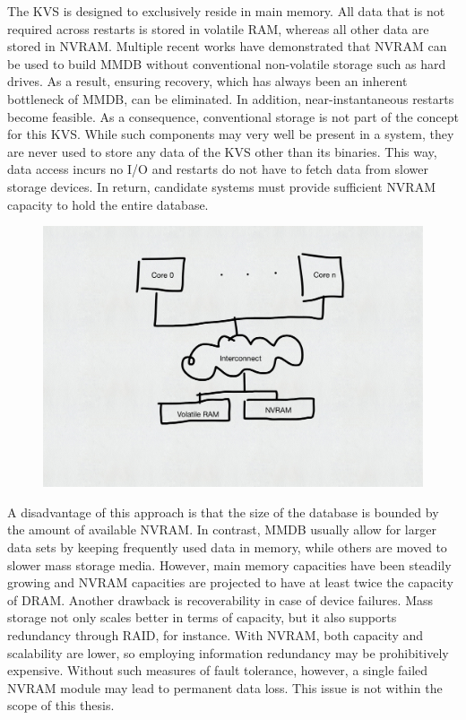 The \ac{KVS} is designed to exclusively reside in main memory. All data that is
not required across restarts is stored in volatile \ac{RAM}, whereas all other
data are stored in \ac{NVRAM}. Multiple recent works have demonstrated that
\ac{NVRAM} can be used to build \ac{MMDB} without conventional non-volatile
storage such as hard drives. As a result, ensuring recovery, which has always
been an inherent bottleneck of \ac{MMDB}, can be eliminated. In addition,
near-instantaneous restarts become feasible. As a consequence, conventional
storage is not part of the concept for this \ac{KVS}. While such components may
very well be present in a system, they are never used to store any data of the
\ac{KVS} other than its binaries. This way, data access incurs no I/O and
restarts do not have to fetch data from slower storage devices. In return,
candidate systems must provide sufficient \ac{NVRAM} capacity to hold the entire
database.

\begin{figure}
    \centering
    \includegraphics[scale=0.5]{figures/drafts/concept-sys-mem.pdf}
    \caption{}
    \label{fig:concept-sys-mem}
\end{figure}

A disadvantage of this approach is that the size of the database is bounded by
the amount of available \ac{NVRAM}. In contrast, \ac{MMDB} usually allow for
larger data sets by keeping frequently used data in memory, while others are
moved to slower mass storage media. However, main memory capacities have been
steadily growing and \ac{NVRAM} capacities are projected to have at least twice
the capacity of \ac{DRAM}. Another drawback is recoverability in case of device
failures. Mass storage not only scales better in terms of capacity, but it also
supports redundancy through \ac{RAID}, for instance. With \ac{NVRAM}, both
capacity and scalability are lower, so employing information redundancy may be
prohibitively expensive. Without such measures of fault tolerance, however, a
single failed \ac{NVRAM} module may lead to permanent data loss. This issue is
not within the scope of this thesis.
